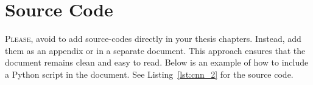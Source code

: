 %
%
%
%
%
%

\chapter{Source Code}\label{app:source-code}
\lettrine[lines=3]{P}{lease,} avoid to add source-codes directly in your thesis chapters. Instead, add them as an appendix or in a separate document. This approach ensures that the document remains clean and easy to read. Below is an example of how to include a Python script in the document. See Listing~\ref{lst:cnn_2} for the source code.

